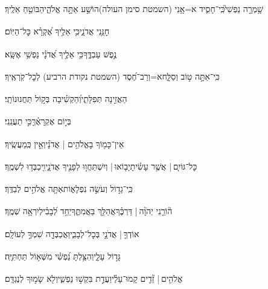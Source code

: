 \documentclass[12pt]{article}
\newcommand{\loc}[1]{\textsuperscript{\locf{#1}}}
\begin{document}
{\loc{ ב}~}‏שָׁ֥מְרָ֣ה נַפְשִׁי֮{\hfill}כִּֽי־חָסִ֢יד א=אָ֥נִי (השמטת סימן העולה)\newline\hspace*{.5em}הוֹשַׁ֣ע  אַתָּ֣ה אֱלֹהַ֑י{\hfill}הַבּוֹטֵ֥חַ אֵלֶֽיךָ׃\par

{\loc{ ג}~}‏חׇנֵּ֥נִי אֲדֹנָ֑י{\hfill}כִּ֥י אֵלֶ֥יךָ אֶ֝קְרָ֗א כׇּל־הַיּֽוֹם׃\par

{\loc{ ד}~}‏ נֶ֣פֶשׁ עַבְדֶּ֑ךָ{\hfill}כִּ֥י אֵלֶ֥יךָ אֲ֝דֹנָ֗י נַפְשִׁ֥י אֶשָּֽׂא׃\par

{\loc{ ה}~}‏כִּֽי־אַתָּ֣ה  ט֣וֹב וְסַלָּ֑ח{\hfill}א=וְרַב־חֶ֝סֶד (השמטת נקודת הרביע) לְכׇל־קֹֽרְאֶֽיךָ׃\par

{\loc{ ו}~}‏הַאֲזִ֣ינָה  תְּפִלָּתִ֑י{\hfill}וְ֝הַקְשִׁ֗יבָה בְּק֣וֹל תַּחֲנוּנוֹתָֽי׃\par

{\loc{ ז}~}‏בְּי֣וֹם  אֶקְרָאֶ֗ךָּ{\hfill}כִּ֣י תַעֲנֵֽנִי׃\par

{\loc{ ח}~}‏אֵין־כָּמ֖וֹךָ בָאֱלֹהִ֥ים | אֲדֹנָ֗י{\hfill}וְאֵ֣ין כְּֽמַעֲשֶֽׂיךָ׃\par

{\loc{ ט}~}‏כׇּל־גּוֹיִ֤ם |  אֲשֶׁ֥ר עָשִׂ֗יתָ{\hfill}יָב֤וֹאוּ |  וְיִשְׁתַּחֲו֣וּ לְפָנֶ֣יךָ אֲדֹנָ֑י{\hfill}וִ֖יכַבְּד֣וּ לִשְׁמֶֽךָ׃\par

{\loc{ י}~}‏כִּֽי־גָד֣וֹל  וְעֹשֵׂ֣ה נִפְלָא֑וֹת{\hfill}אַתָּ֖ה אֱלֹהִ֣ים לְבַדֶּֽךָ׃\par

{\loc{ יא}~}‏ה֘וֹרֵ֤נִי יְהֹוָ֨ה |  דַּרְכֶּ֗ךָ{\hfill}אֲהַלֵּ֥ךְ בַּאֲמִתֶּ֑ךָ\newline\hspace*{.5em}יַחֵ֥ד לְ֝בָבִ֗י{\hfill}לְיִרְאָ֥ה שְׁמֶֽךָ׃\par

{\loc{ יב}~}‏אוֹדְךָ֤ |  אֲדֹנָ֣י  בְּכׇל־לְבָבִ֑י{\hfill}וַאֲכַבְּדָ֖ה שִׁמְךָ֣ לְעוֹלָֽם׃\par

{\loc{ יג}~}‏ גָּד֣וֹל עָלָ֑י{\hfill}וְהִצַּ֥לְתָּ נַ֝פְשִׁ֗י מִשְּׁא֥וֹל תַּחְתִּיָּֽה׃\par

{\loc{ יד}~}‏אֱלֹהִ֤ים |  זֵ֘דִ֤ים קָמוּ־עָלַ֗י{\hfill}וַעֲדַ֣ת \newline\hspace*{.5em}בִּקְשׁ֣וּ נַפְשִׁ֑י{\hfill}וְלֹ֖א שָׂמ֣וּךָ לְנֶגְדָּֽם׃\par
\end{document}
